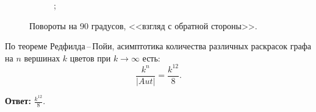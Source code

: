 \begin{solution}
\begin{figure}[H]
\begin{subfigure}[b]{0.4\linewidth}
{            ;
        }
    \end{subfigure}
    \caption{Повороты на 90 градусов, <<взгляд с обратной стороны>>.}
\end{figure}

По теореме Редфилда\,--\,Пойи, асимптотика количества различных раскрасок графа на \(n\) вершинах \(k\) цветов при \(k\to\infty\) есть:
\begin{equation*}
    \frac{k^n}{\left\lvert Aut \right\lvert} = \frac{k^{12}}{8}.
\end{equation*}

\textbf{Ответ: } \(\displaystyle \frac{k^{12}}{8}\).

\end{solution}
